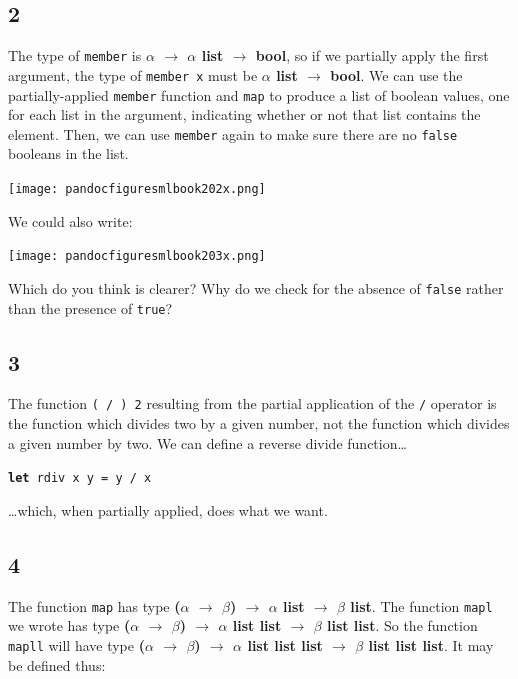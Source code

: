 \documentclass[]{book}
\newcommand{\smspace}{\vspace{4mm}}
\begin{document}
\subsection*{2}
The type of \texttt{member} is \textbf{\textsf{$\alpha$ $\rightarrow$ $\alpha$ list $\rightarrow$ bool}}, so if we partially apply the first argument, the type of \texttt{member x} must be \textsf{\textbf{$\alpha$ list $\rightarrow$ bool}}. We can use the partially-applied \texttt{member} function and \texttt{map} to produce a list of boolean values, one for each list in the argument, indicating whether or not that list contains the element. Then, we can use \texttt{member} again to make sure there are no \texttt{false} booleans in the list.

\medskip
\begin{center}
\noindent\texttt{[image: pandocfiguresmlbook202x.png]}
\end{center}
\medskip

\noindent We could also write:

\medskip
\begin{center}
\noindent\texttt{[image: pandocfiguresmlbook203x.png]}
\end{center}
\medskip

\noindent Which do you think is clearer? Why do we check for the absence of \texttt{false} rather than the presence of \texttt{true}?

\subsection*{3}

The function \texttt{( / ) 2} resulting from the partial application of the \texttt{/} operator is the function which divides two by a given number, not the function which divides a given number by two. We can define a reverse divide function\ldots

\smspace
\textbf{\texttt{let}}\texttt{ rdiv x y = y / x}
\smspace

\noindent \ldots which, when partially applied, does what we want.

\subsection*{4}

The function \texttt{map} has type \textbf{\textsf{\textmd{(}$\alpha$ $\rightarrow$ $\beta$\textmd{)} $\rightarrow$ $\alpha$ list $\rightarrow$ $\beta$ list}}. The function \texttt{mapl} we wrote has type \textbf{\textsf{\textmd{(}$\alpha$ $\rightarrow$ $\beta$\textmd{)} $\rightarrow$ $\alpha$ list list $\rightarrow$ $\beta$ list list}}. So the function \texttt{mapll} will have type \textbf{\textsf{\textmd{(}$\alpha$ $\rightarrow$ $\beta$\textmd{)} $\rightarrow$ $\alpha$ list list list $\rightarrow$ $\beta$ list list list}}. It may be defined thus:
\end{document}

